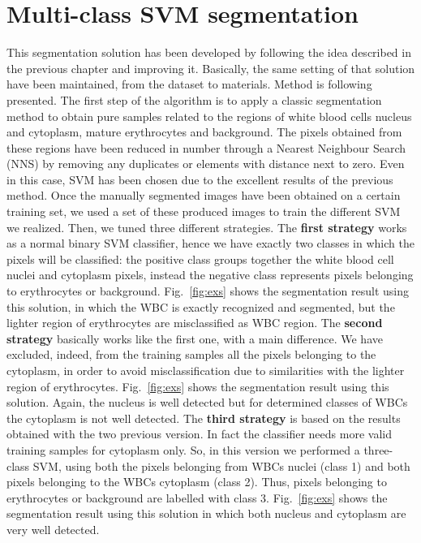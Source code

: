 \documentclass[final,a4paper,12pt,english]{UnicaPhdThesis3}
\begin{document}
\section{Multi-class SVM segmentation} \label{caip2015}  %
This segmentation solution has been developed by following the idea described in the previous chapter and improving it.
Basically, the same setting of that solution have been maintained, from the dataset to materials. Method is following presented.
The first step of the algorithm is to apply a classic segmentation method to obtain pure samples related to the regions of white blood cells nucleus and cytoplasm, mature erythrocytes and background. The pixels obtained from these regions have been reduced in number through a Nearest Neighbour  Search (NNS) by removing any duplicates or elements with distance next to zero. Even in this case, SVM has been chosen due to the excellent results of the previous method. Once the manually segmented images have been obtained on a certain training set, we used a set of these produced images to train the different SVM we realized. Then, we tuned three different strategies. 
The \textbf{first strategy} works as a normal binary SVM classifier, hence we have exactly two classes in which the pixels will be classified: the positive class groups together the white blood cell nuclei and cytoplasm pixels, instead the negative class represents pixels belonging to erythrocytes or background. Fig.~\ref{fig:exs} shows the segmentation result using this solution, in which the WBC is exactly recognized and segmented, but the lighter region of erythrocytes are misclassified as WBC region. 
The \textbf{second strategy} basically works like the first one, with a main difference. We have excluded, indeed, from the training samples all the pixels belonging to the cytoplasm, in order to avoid misclassification due to similarities with the lighter region of erythrocytes. Fig.~\ref{fig:exs} shows the segmentation result using this solution. Again, the nucleus is well detected but for determined classes of WBCs the cytoplasm is not well detected. 
The \textbf{third strategy} is based on the results obtained with the two previous version. In fact the classifier needs more valid training samples for cytoplasm only. So, in this version we performed a three-class SVM, using both the pixels belonging from WBCs nuclei (class 1) and both pixels belonging to the WBCs cytoplasm (class 2). Thus, pixels belonging to erythrocytes or background are labelled with class 3. Fig.~\ref{fig:exs} shows the segmentation result using this solution in which both nucleus and cytoplasm are very well detected.
\end{document}
